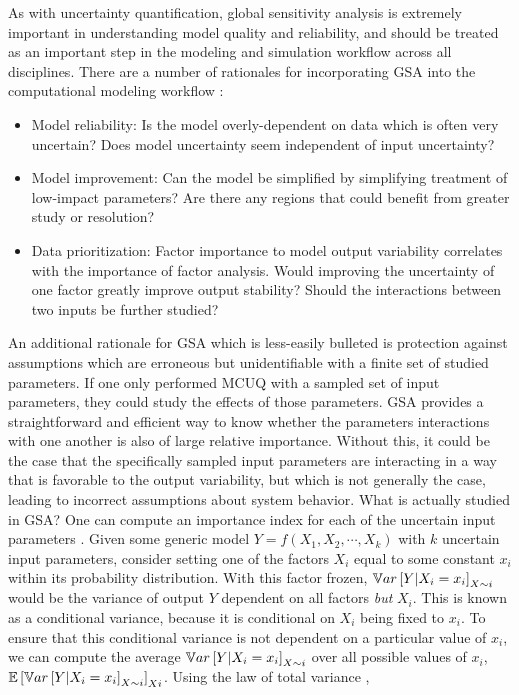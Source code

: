 As with uncertainty quantification, global sensitivity analysis is extremely important in understanding model quality and reliability, and should be treated as an important step in the modeling and simulation workflow across all disciplines. There are a number of rationales for incorporating GSA into the computational modeling workflow \cite{saltelli2005}:
\begin{itemize}
    \item Model reliability: Is the model overly-dependent on data which is often very uncertain? Does model uncertainty seem independent of input uncertainty?
    \item Model improvement: Can the model be simplified by simplifying treatment of low-impact parameters? Are there any regions that could benefit from greater study or resolution?
    \item Data prioritization: Factor importance to model output variability correlates with the importance of factor analysis. Would improving the uncertainty of one factor greatly improve output stability? Should the interactions between two inputs be further studied?
\end{itemize}
An additional rationale for GSA which is less-easily bulleted is protection against assumptions which are erroneous but unidentifiable with a finite set of studied parameters. If one only performed MCUQ with a sampled set of input parameters, they could study the effects of those parameters. GSA provides a straightforward and efficient way to know whether the parameters interactions with one another is also of large relative importance. Without this, it could be the case that the specifically sampled input parameters are interacting in a way that is favorable to the output variability, but which is not generally the case, leading to incorrect assumptions about system behavior. 
What is actually studied in GSA? One can compute an importance index for each of the uncertain input parameters \cite{sobol}. Given some generic model $Y=f(X_1,X_2,\cdots,X_k)$ with $k$ uncertain input parameters, consider setting one of the factors $X_i$ equal to some constant $x_i$ within its probability distribution. With this factor frozen, $\mathbb{V}ar\left[Y|X_i=x_i\right]_{X\sim i}$ would be the variance of output $Y$ dependent on all factors \textit{but} $X_i$. This is known as a conditional variance, because it is conditional on $X_i$ being fixed to $x_i$. To ensure that this conditional variance is not dependent on a particular value of $x_i$, we can compute the average $\mathbb{V}ar\left[Y|X_i=x_i\right]_{X\sim i}$ over all possible values of $x_i$, $\mathbb{E}\left[\mathbb{V}ar\left[Y|X_i=x_i\right]_{X\sim i}\right]_{Xi}$. Using the law of total variance \cite{saltelliGSA},
